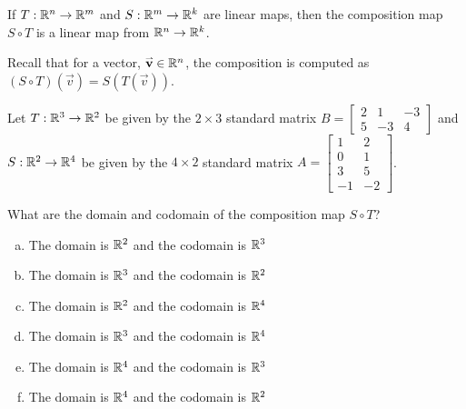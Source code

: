 \begin{observation}
If \(T: \mathbb{R}^n \rightarrow \mathbb{R}^m\) and \(S: \mathbb{R}^m \rightarrow \mathbb{R}^k\) are linear maps, then the composition map \(S\circ T\) is a linear map from \(\mathbb{R}^n \rightarrow \mathbb{R}^k\).
\vfill
\begin{center}
\end{center}
\vfill
Recall that for a vector, \(\mathbf{\accentset{\rightharpoonup}{v}} \in \mathbb{R}^n\), the composition is computed as \( (S \circ T)(\vec{v})=S(T(\vec{v}))\).
\end{observation}


\begin{activity}{5}
Let \(T: \mathbb{R}^3 \rightarrow \mathbb{R}^2\) be given by the \(2\times 3\) standard matrix \(B=\begin{bmatrix} 2 & 1 & -3 \\ 5 & -3 & 4 \end{bmatrix}\) and \(S: \mathbb{R}^2 \rightarrow \mathbb{R}^4\) be given by the \(4\times 2\) standard matrix \(A=\begin{bmatrix} 1 & 2 \\ 0 & 1 \\ 3 & 5 \\ -1 & -2 \end{bmatrix}\).

What are the domain and codomain of the composition map \(S \circ T\)?
\begin{enumerate}[(a)]
\item The domain is \(\mathbb{R} ^2\) and the codomain is \(\mathbb{R}^3\)
\item The domain is \(\mathbb{R} ^3\) and the codomain is \(\mathbb{R}^2\)
\item The domain is \(\mathbb{R} ^2\) and the codomain is \(\mathbb{R}^4\)
\item The domain is \(\mathbb{R} ^3\) and the codomain is \(\mathbb{R}^4\)
\item The domain is \(\mathbb{R} ^4\) and the codomain is \(\mathbb{R}^3\)
\item The domain is \(\mathbb{R} ^4\) and the codomain is \(\mathbb{R}^2\)
\end{enumerate}
\end{activity}



